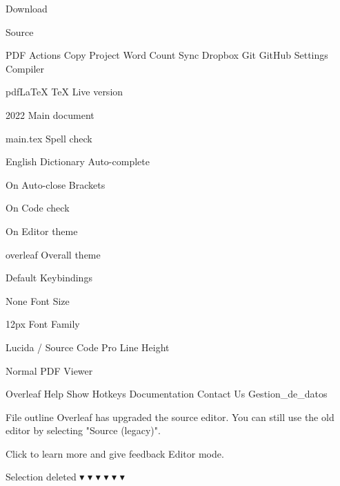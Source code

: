 Download

Source

PDF
Actions
   Copy Project
   Word Count
Sync
   Dropbox
   Git
   GitHub
Settings
Compiler

pdfLaTeX
TeX Live version

2022
Main document

main.tex
Spell check

English
Dictionary
Auto-complete

On
Auto-close Brackets

On
Code check

On
Editor theme

overleaf
Overall theme

Default
Keybindings

None
Font Size

12px
Font Family

Lucida / Source Code Pro
Line Height

Normal
PDF Viewer

Overleaf
Help
   Show Hotkeys
   Documentation
   Contact Us
Gestion_de_datos

File outline
Overleaf has upgraded the source editor. You can still use the old editor by selecting "Source (legacy)".

Click to learn more and give feedback
Editor mode.


 
Selection deleted
▾
▾
▾
▾
▾
▾


